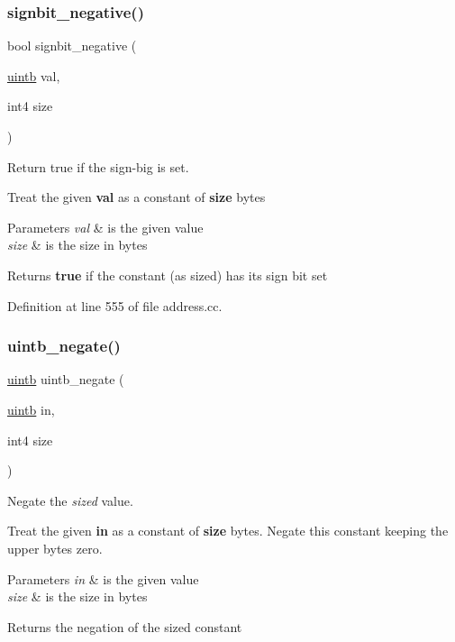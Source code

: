 \subsubsection{\texorpdfstring{signbit\_negative()}{signbit\_negative()}}
{\footnotesize\ttfamily bool signbit\+\_\+negative (\begin{DoxyParamCaption}\item[{\mbox{\hyperlink{types_8h_a2db313c5d32a12b01d26ac9b3bca178f}{uintb}}}]{val,  }\item[{int4}]{size }\end{DoxyParamCaption})}



Return true if the sign-\/big is set. 

Treat the given {\bfseries{val}} as a constant of {\bfseries{size}} bytes 
\begin{DoxyParams}{Parameters}
{\em val} & is the given value \\
\hline
{\em size} & is the size in bytes \\
\hline
\end{DoxyParams}
\begin{DoxyReturn}{Returns}
{\bfseries{true}} if the constant (as sized) has its sign bit set 
\end{DoxyReturn}


Definition at line 555 of file address.\+cc.

\mbox{\label{address_8hh_a78cde28c4eada28e12fe0dbdfb840753}} 
\subsubsection{\texorpdfstring{uintb\_negate()}{uintb\_negate()}}
{\footnotesize\ttfamily \mbox{\hyperlink{types_8h_a2db313c5d32a12b01d26ac9b3bca178f}{uintb}} uintb\+\_\+negate (\begin{DoxyParamCaption}\item[{\mbox{\hyperlink{types_8h_a2db313c5d32a12b01d26ac9b3bca178f}{uintb}}}]{in,  }\item[{int4}]{size }\end{DoxyParamCaption})}



Negate the {\itshape sized} value. 

Treat the given {\bfseries{in}} as a constant of {\bfseries{size}} bytes. Negate this constant keeping the upper bytes zero. 
\begin{DoxyParams}{Parameters}
{\em in} & is the given value \\
\hline
{\em size} & is the size in bytes \\
\hline
\end{DoxyParams}
\begin{DoxyReturn}{Returns}
the negation of the sized constant 
\end{DoxyReturn}


